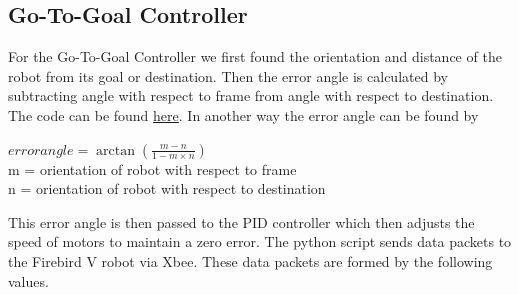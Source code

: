 \documentclass[a4paper,12pt,oneside]{book}
\begin{document}
\subsection*{Go-To-Goal Controller}
For the Go-To-Goal Controller we first found the orientation and distance of the robot from its goal or destination. Then the error angle is calculated by subtracting angle with respect to frame from angle with respect to destination. The code can be found \href{https://github.com/eYSIP-2018/Jigsaw_Puzzle_Solver_using_Multiple_Robots/blob/master/Scripts/ArUco detection orientation/Aruco_pose_with_other_point.py}{here}. In another way the error angle can be found by
\begin{center}
$error angle = \arctan \left (\frac{m - n}{1 - m\times n}\right)$\\
m = orientation of robot with respect to frame\\
\hspace{2.7 em}n = orientation of robot with respect to destination\end{center}
This error angle is then passed to the PID controller which then adjusts the speed of motors to maintain a zero error. The python script sends data packets to the Firebird V robot via Xbee. These data packets are formed by the following values.
\end{document}
